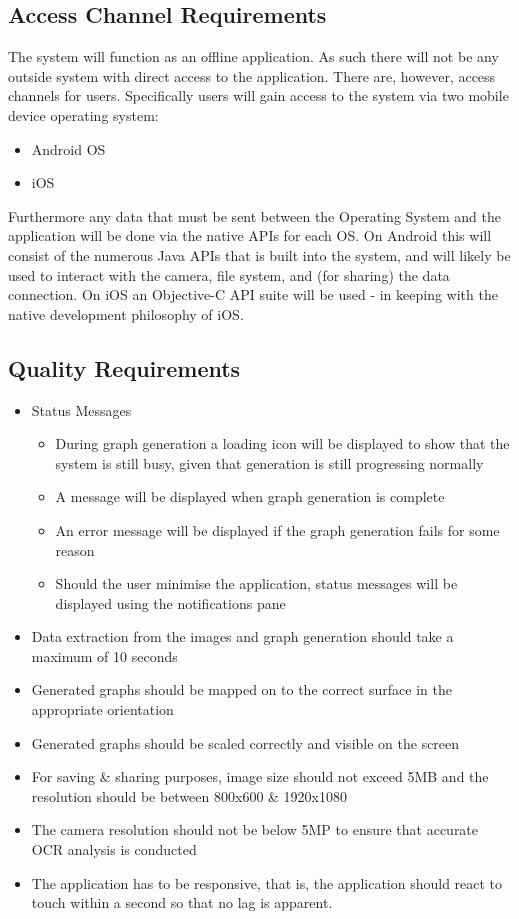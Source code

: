 \documentclass[a4paper,12pt]{article}
\begin{document}
\subsection{Access Channel Requirements}
The system will function as an offline application. As such there will not be any outside system with direct access to the application. There are, however, access channels for users. Specifically users will gain access to the system via two mobile device operating system:
\begin{itemize}
	\item Android OS
	\item iOS
\end{itemize}

Furthermore any data that must be sent between the Operating System and the application will be done via the native APIs for each OS. On Android this will consist of the numerous Java APIs that is built into the system, and will likely be used to interact with the camera, file system, and (for sharing) the data connection. On iOS an Objective-C API suite will be used - in keeping with the native development philosophy of iOS.
\subsection{Quality Requirements}

\begin{itemize}
	\item Status Messages
		\begin{itemize}
			\item During graph generation a loading icon will be displayed to show that the system is still busy, given that generation is still progressing normally
			\item A message will be displayed when graph generation is complete
			\item An error message will be displayed if the graph generation fails for some reason
			\item Should the user minimise the application, status messages will be displayed using the notifications pane
		\end{itemize}
		
	\item Data extraction from the images and graph generation should take a maximum of 10 seconds
	\item Generated graphs should be mapped on to the correct surface in the appropriate orientation
	\item Generated graphs should be scaled correctly and visible on the screen
\item For saving \& sharing purposes, image size should not exceed 5MB and the  resolution should be between 800x600 \& 1920x1080
	\item The camera resolution should not be below 5MP to ensure that accurate OCR analysis is conducted
	\item The application has to be responsive, that is, the application should react to touch within a second so that no lag is apparent.
\end{itemize}
\end{document}
